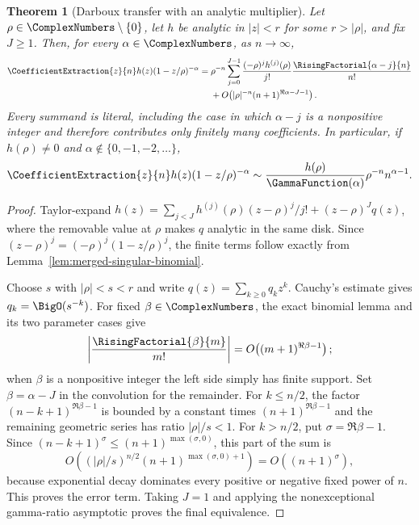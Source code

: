 \documentclass[11pt,a4paper,oneside,openany]{book}
\newtheorem{theorem}{Theorem}[chapter]
\theoremstyle{definition}
\theoremstyle{remark}
\begin{document}
\begin{theorem}[Darboux transfer with an analytic multiplier]
\label{thm:merged-darboux-transfer}
Let $\rho\in\ComplexNumbers\setminus\{0\}$, let $h$ be analytic in
$|z|<r$ for some $r>|\rho|$, and fix $J\geq1$.  Then, for every
$\alpha\in\ComplexNumbers$, as $n\to\infty$,
\begin{align}
 \CoefficientExtraction{z}{n}h(z)(1-z/\rho)^{-\alpha}
={}&\rho^{-n}\sum_{j=0}^{J-1}\frac{(-\rho)^jh^{(j)}(\rho)}{j!}
 \frac{\RisingFactorial{\alpha-j}{n}}{n!}                         \notag\\
 &+O\!\left(|\rho|^{-n}(n+1)^{\Re\alpha-J-1}\right).             \label{eq:merged-darboux-transfer}
\end{align}
Every summand is literal, including the case in which $\alpha-j$ is a
nonpositive integer and therefore contributes only finitely many coefficients.
In particular, if $h(\rho)\ne0$ and
$\alpha\notin\{0,-1,-2,\ldots\}$,
\begin{equation}
 \CoefficientExtraction{z}{n}h(z)(1-z/\rho)^{-\alpha}
 \sim\frac{h(\rho)}{\GammaFunction(\alpha)}\rho^{-n}n^{\alpha-1}.         \label{eq:merged-basic-transfer}
\end{equation}
\end{theorem}

\begin{proof}
Taylor-expand
$h(z)=\sum_{j<J}h^{(j)}(\rho)(z-\rho)^j/j!+(z-\rho)^Jq(z)$, where the
removable value at $\rho$ makes $q$ analytic in the same disk.  Since
$(z-\rho)^j=(-\rho)^j(1-z/\rho)^j$, the finite terms follow exactly from
Lemma~\ref{lem:merged-singular-binomial}.

Choose $s$ with $|\rho|<s<r$ and write $q(z)=\sum_{k\geq0}q_kz^k$.
Cauchy's estimate gives $q_k=\BigO(s^{-k})$.  For fixed
$\beta\in\ComplexNumbers$, the exact
binomial lemma and its two parameter cases give
\[
 \left|\frac{\RisingFactorial{\beta}{m}}{m!}\right|
 =O\!\left((m+1)^{\Re\beta-1}\right);
\]
when $\beta$ is a nonpositive integer the left side simply has finite support.
Set $\beta=\alpha-J$ in the convolution for the remainder.  For $k\leq n/2$,
the factor $(n-k+1)^{\Re\beta-1}$ is bounded by a constant times
$(n+1)^{\Re\beta-1}$ and the remaining geometric series has ratio
$|\rho|/s<1$.  For $k>n/2$, put $\sigma=\Re\beta-1$.  Since
$(n-k+1)^\sigma\leq(n+1)^{\max(\sigma,0)}$, this part of the sum is
\[
 O\!\left((|\rho|/s)^{n/2}(n+1)^{\max(\sigma,0)+1}\right)
 =O\!\left((n+1)^\sigma\right),
\]
because exponential decay dominates every positive or negative fixed power
of $n$.  This proves the error term.  Taking $J=1$ and applying the
nonexceptional gamma-ratio asymptotic proves the final equivalence.
\end{proof}
\end{document}
